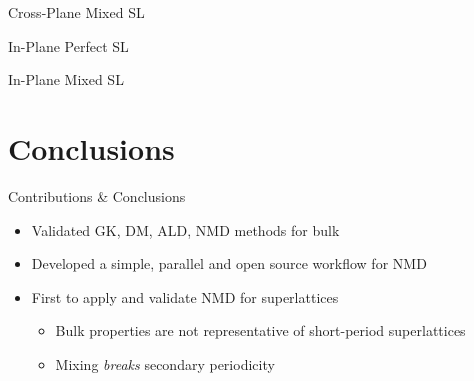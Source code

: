 \documentclass{beamer}
\begin{document}
\begin{frame}{Cross-Plane Mixed SL}
\begin{figure}[t]
\begin{center}
\vspace*{-0.8cm}
\renewcommand{\figure}{Fig.}
\label{fig:cp_all}
\end{center}
\end{figure}
\end{frame}

\begin{frame}{In-Plane Perfect SL}
\begin{figure}[t]
\begin{center}
\vspace*{-0.8cm}
\renewcommand{\figure}{Fig.}
\label{fig:ip}
\end{center}
\end{figure}
\end{frame}

\begin{frame}{In-Plane Mixed SL}
\begin{figure}[t]
\begin{center}
\vspace*{-0.8cm}
\renewcommand{\figure}{Fig.}
\label{fig:ip_all}
\end{center}
\end{figure}
\end{frame}

\section{Conclusions}
\begin{frame}{Contributions \& Conclusions}
\begin{itemize}
\item Validated GK, DM, ALD, NMD methods for bulk
\item Developed a simple, parallel and open source workflow for NMD
\item First to apply and validate NMD for superlattices
\begin{itemize}
\item Bulk properties are not representative of short-period superlattices
\item Mixing \textit{breaks} secondary periodicity
\end{itemize}
\end{itemize}
\end{frame}
\end{document}
